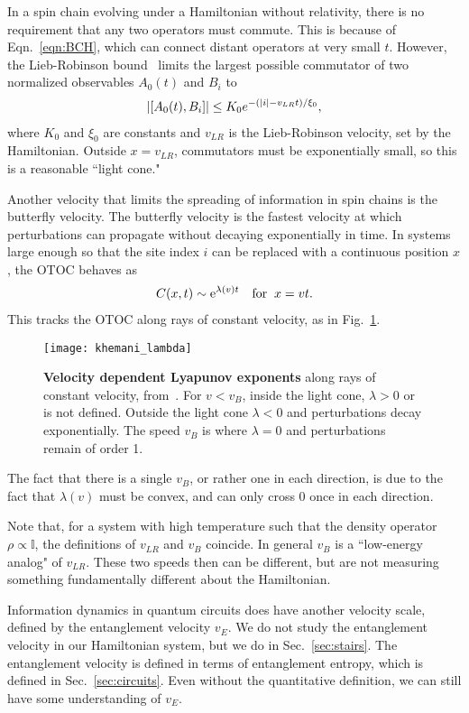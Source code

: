 In a spin chain evolving under a Hamiltonian without relativity, there is no requirement that any two operators must commute. This is because of Eqn.~\ref{eqn:BCH}, which can connect distant operators at very small $t$. However, the Lieb-Robinson bound~\cite{Lieb} limits the largest possible commutator of two normalized observables $A_0(t)$ and $B_i$ to
\begin{align}
\left|\left[A_0(t),B_i\right]\right|\le K_0 e^{-(\left|i\right|-v_{LR}t)/\xi_0},
\end{align}
where $K_0$ and $\xi_0$ are constants and $v_{LR}$ is the Lieb-Robinson velocity, set by the Hamiltonian. Outside $x=v_{LR}$, commutators must be exponentially small, so this is a reasonable ``light cone."

Another velocity that limits the spreading of information in spin chains is the butterfly velocity.
The butterfly velocity is the fastest velocity at which perturbations can propagate without decaying exponentially in time. In systems large enough so that the site index $i$ can be replaced with a continuous position $x$, the OTOC behaves as~\cite{Khemani2018}
\begin{align}
C(x,t)\sim \text{e}^{\lambda(v)t}\quad\text{for}\;\;x=vt.\label{eqn:butterfly}
\end{align}
This tracks the OTOC along rays of constant velocity, as in Fig.~\ref{fig:khemani_lambda}.
\begin{figure}
	\centering
	\texttt{[image: khemani\_lambda]}
	\caption{\textbf{Velocity dependent Lyapunov exponents} along rays of constant velocity, from~\cite{Khemani2018}. For $v<v_B$, inside the light cone, $\lambda>0$ or is not defined. Outside the light cone $\lambda<0$ and perturbations decay exponentially. The speed $v_B$ is where $\lambda=0$ and perturbations remain of order 1.}
	\label{fig:khemani_lambda}
\end{figure}
The fact that there is a single $v_B$, or rather one in each direction, is due to the fact that $\lambda(v)$ must be convex, and can only cross 0 once in each direction.

Note that, for a system with high temperature such that the density operator $\rho\propto\mathbb{I}$, the definitions of $v_{LR}$ and $v_B$ coincide. In general $v_B$ is a ``low-energy analog" of $v_{LR}$. These two speeds then can be different, but are not measuring something fundamentally different about the Hamiltonian.

Information dynamics in quantum circuits does have another velocity scale, defined by the entanglement velocity $v_E$. We do not study the entanglement velocity in our Hamiltonian system, but we do in Sec.~\ref{sec:stairs}. The entanglement velocity is defined in terms of entanglement entropy, which is defined in Sec.~\ref{sec:circuits}. Even without the quantitative definition, we can still have some understanding of $v_E$.

